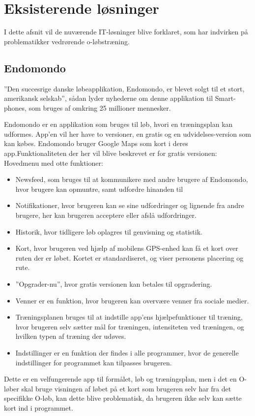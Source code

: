 \chapter{Eksisterende løsninger}
I dette afsnit vil de nuværende IT-løsninger blive forklaret, som har indvirken på problematikker vedrørende o-løbstræning. 

\section{Endomondo}
”Den succesrige danske løbeapplikation, Endomondo, er blevet solgt til et stort, amerikansk selskab”, sådan lyder nyhederne om denne applikation til Smart-phones, som bruges af omkring 25 millioner mennesker. \citep{ENDO}

Endomondo er en applikation som bruges til løb, hvori en træningsplan kan udformes. App’en vil her have to versioner, en gratis og en udvidelses-version som kan købes. Endomondo bruger Google Maps som kort i deres app\citep{ENDOMAPS}.Funktionaliteten der her vil blive beskrevet er for gratis versionen: Hovedmenu med otte funktioner:
\begin{itemize}
\item Newsfeed, som bruges til at kommunikere med andre brugere af Endomondo, hvor brugere kan opmuntre, samt udfordre hinanden til
\item Notifikationer, hvor brugeren kan se sine udfordringer og lignende fra andre brugere, her kan brugeren acceptere eller afslå udfordringer.
\item Historik, hvor tidligere løb oplagres til genvisning og statistik.
\item Kort, hvor brugeren ved hjælp af mobilens GPS-enhed kan få et kort over ruten der er løbet. Kortet er standardiseret, og viser personens placering og rute.
\item ”Opgrader-nu”, hvor gratis versionen kan betales til opgradering.
\item Venner er en funktion, hvor brugeren kan overvære venner fra sociale medier.
\item Træningsplanen bruges til at indstille app’ens hjælpefunktioner til træning, hvor brugeren selv sætter mål for træningen, intensiteten ved træningen, og hvilken typen af træning der udøves.
\item Indstillinger er en funktion der findes i alle programmer, hvor de generelle indstillinger for programmet kan tilpasses brugeren.
\end{itemize}
Dette er en velfungerende app til formålet, løb og træningsplan, men i det en O-løber skal bruge visningen af løbet på et kort som brugeren selv har fra det specifikke O-løb, kan dette blive problematisk, da brugeren ikke selv kan sætte kort ind i programmet. 


